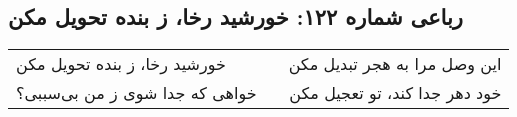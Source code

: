 \begin{center}
\section*{رباعی شماره ۱۲۲: خورشید رخا، ز بنده تحویل مکن}
\label{sec:122}
\begin{longtable}{l p{0.5cm} r}
خورشید رخا، ز بنده تحویل مکن
&&
این وصل مرا به هجر تبدیل مکن
\\
خواهی که جدا شوی ز من بی‌سببی؟
&&
خود دهر جدا کند، تو تعجیل مکن
\\
\end{longtable}
\end{center}
